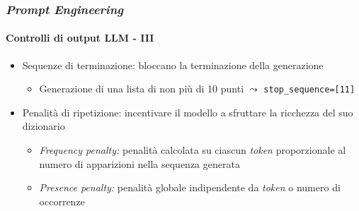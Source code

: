 \begin{frame}[t] \frametitle{\emph{Prompt Engineering}}
\framesubtitle{Controlli di output LLM - III}
{\small
    \begin{minipage}[t]{\textwidth}
        \begin{itemize}[leftmargin=10pt,align=right]
            \item[\alertedcircled{3}] \alert{Sequenze di terminazione:} bloccano la terminazione della generazione
            \begin{itemize}[leftmargin=10pt,align=right]
                \item[\alert{\faArrowCircleRight}] Generazione di una lista di non più di 10 punti $\leadsto$ \texttt{stop\_sequence=[11]}     
            \end{itemize}
            \item[\alertedcircled{4}] \alert{Penalità di ripetizione:} incentivare il modello a sfruttare la ricchezza del suo dizionario
            \begin{itemize}[leftmargin=10pt,align=right]
                \item[\alert{\faArrowCircleRight}] \alert{\textit{Frequency penalty:}} penalità calcolata su ciascun \textit{token} proporzionale al numero di apparizioni nella sequenza generata
                \item[\alert{\faArrowCircleRight}] \alert{\textit{Presence penalty:}} penalità \alert{globale} indipendente da \textit{token} o numero di occorrenze
            \end{itemize}
        \end{itemize}
    \end{minipage}
}
\end{frame}
%
